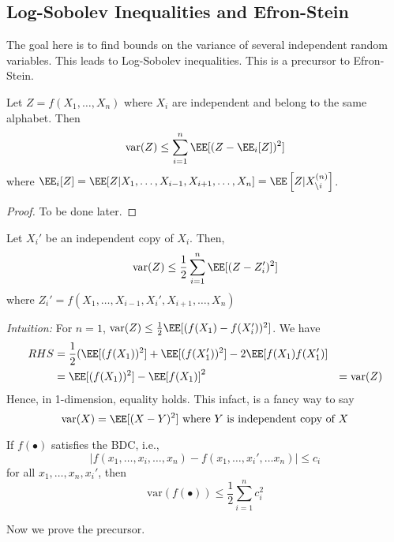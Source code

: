 \subsection{ Log-Sobolev Inequalities and Efron-Stein}
The goal here is to find bounds on the variance of several independent random variables. This leads to Log-Sobolev inequalities. This is a precursor to Efron-Stein. 
\begin{theorem}\label{thm:efron-stein-precursor}
Let $Z = f(X_1, \dots, X_n)$ where $X_i$ are independent and belong to the same alphabet. Then
\begin{equation}
    \text{var}(Z) \leq \sum_{i=1}^n \EE[(Z- \EE_i[Z])^2]
\end{equation}
where $\EE_i[Z] = \EE[Z | X_1, \dots, X_{i-1}, X_{i+1}, \dots, X_n] = \EE\left[Z | X_{\setminus i}^{(n)}\right]$.
\end{theorem}
\begin{proof}
To be done later.
\end{proof}
\begin{theorem}
Let $X_i'$ be an independent copy of $X_i$. Then,
\begin{equation}
    \text{var}(Z) \leq \frac{1}{2} \sum_{i=1}^n \EE[(Z - Z_i')^2]
\end{equation}
where $Z_i' = f(X_1, \dots, X_{i-1}, X_i', X_{i+1}, \dots, X_n)$
\end{theorem}
\begin{note}
\textit{Intuition:} For $n = 1$, $\text{var}(Z) \leq \frac12 \EE[(f(X_1) - f(X_i'))^2]$. We have
\begin{align*}
    RHS &= \frac{1}{2} (\EE[(f(X_1))^2] + \EE[(f(X_1'))^2] - 2\EE[f(X_1)f(X_1')] \\
    &= \EE[(f(X_1))^2] - \EE[f(X_1)]^2 &= \text{var}(Z)
\end{align*}
Hence, in 1-dimension, equality holds. This infact, is a fancy way to say
\[
\text{var}(X) = \EE[(X-Y)^2] \text{ where $Y$ is independent copy of $X$}
\]
\end{note}
\begin{eg}
If $f(\bullet)$ satisfies the BDC, i.e.,
\[
|f(x_1, \dots, x_i,\dots, x_n) - f(x_1, \dots, x_i', \dots x_n) |\leq c_i
\]
 for all $x_1, \dots, x_n, x_i'$, then
 \[
 \text{var}(f(\bullet)) \leq \frac{1}{2} \sum_{i=1}^n c_i^2
 \]
\end{eg}
Now we prove the precursor.
